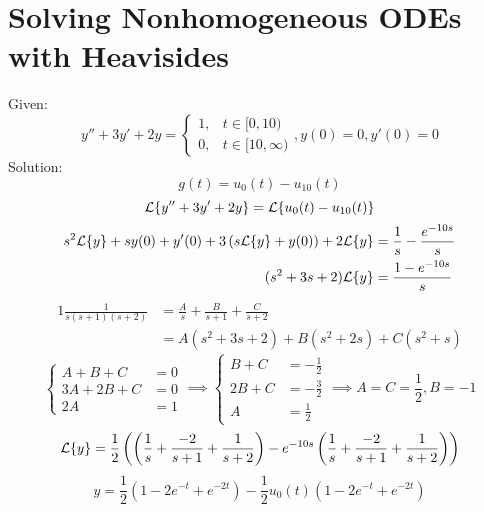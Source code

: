 \documentclass[diffeq.tex]{subfiles}
\begin{document}
\section{Solving Nonhomogeneous ODEs with Heavisides}
\begin{homework*}[268.4]
    Given:
    \begin{equation}
        y'' + 3y' + 2y = \begin{cases}
            1, &t\in[0, 10)\\
            0, &t\in[10,\infty)
        \end{cases}, y(0) = 0, y'(0) = 0
    \end{equation}
    Solution:
    \begin{equation}
        g(t) = u_{0}(t) - u_{10}(t)
    \end{equation}
    \begin{equation}
        \mathcal{L}\{y'' + 3y' + 2y\} = \mathcal{L}\{u_{0}(t) - u_{10}(t)\}
    \end{equation}
    \begin{alignat}{1}
        s^{2}\mathcal{L}\{y\}+sy(0)+y'(0)+3\left(s\mathcal{L}\{y\}+y(0)\right) + 2\mathcal{L}\{y\} &= \frac{1}{s} - \frac{e^{-10s}}{s}\\
        (s^{2} + 3s + 2)\mathcal{L}\{y\} &= \frac{1 - e^{-10s}}{s}
    \end{alignat}
    \begin{alignat}{1}
        \frac{1}{s(s + 1)(s + 2)} &= \frac{A}{s} + \frac{B}{s + 1} + \frac{C}{s + 2}\\
        &= A(s^{2} + 3s + 2) + B(s^{2} + 2s) + C(s^{2} + s)
    \end{alignat}
    \begin{equation}
        \begin{cases}
            A + B + C &= 0\\
            3A + 2B + C &= 0\\
            2A &= 1
        \end{cases}
        \implies
        \begin{cases}
            B + C &= -\frac{1}{2}\\
            2B + C &= -\frac{3}{2}\\
            A &= \frac{1}{2}
        \end{cases}
        \implies
        A = C = \frac{1}{2}, B = -1
    \end{equation}
    \begin{equation}
        \mathcal{L}\{y\} = \frac{1}{2}\left(\left(\frac{1}{s} + \frac{-2}{s + 1} + \frac{1}{s + 2}\right) - e^{-10s}\left(\frac{1}{s} + \frac{-2}{s + 1} + \frac{1}{s + 2}\right)\right)
    \end{equation}
    \begin{equation}
        y = \frac{1}{2}\left(1 - 2e^{-t} + e^{-2t}\right) - \frac{1}{2}u_{0}(t)\left(1 - 2e^{-t} + e^{-2t}\right)
    \end{equation}
\end{homework*}
\end{document}
